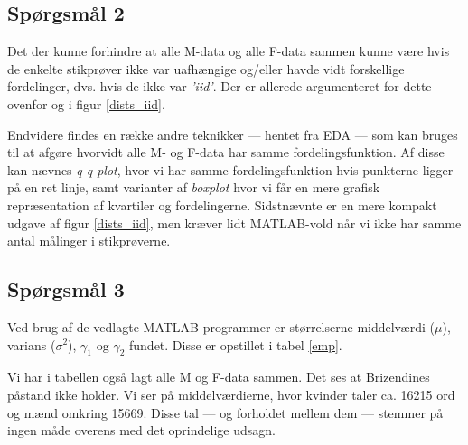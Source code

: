 \documentclass[a4paper, 10pt, danish, final]{article}
\begin{document}
\subsection*{Spørgsmål 2}
Det der kunne forhindre at alle M-data og alle F-data sammen kunne være
hvis de enkelte stikprøver ikke var uafhængige og/eller havde vidt
forskellige fordelinger, dvs. hvis de ikke var \emph{'iid'}. Der er
allerede argumenteret for dette ovenfor og i figur \ref{dists_iid}.

Endvidere findes en række andre teknikker --- hentet fra EDA
\citep[kap. 5]{1199778} --- som kan bruges til at afgøre hvorvidt alle
M- og F-data har samme fordelingsfunktion. Af disse kan nævnes
\emph{q-q plot}, hvor vi har samme fordelingsfunktion hvis punkterne
ligger på en ret linje, samt varianter af \emph{boxplot} hvor vi får en
mere grafisk repræsentation af kvartiler og fordelingerne. Sidstnævnte
er en mere kompakt udgave af figur \ref{dists_iid}, men kræver lidt
MATLAB-vold når vi ikke har samme antal målinger i stikprøverne.

\subsection*{Spørgsmål 3}
Ved brug af de vedlagte MATLAB-programmer er størrelserne middelværdi
($\mu$), varians ($\sigma^2$), $\gamma_1$ og $\gamma_2$ fundet. Disse er
opstillet i tabel \ref{emp}.

Vi har i tabellen også lagt alle M og F-data sammen. Det ses at
Brizendines påstand ikke holder. Vi ser på middelværdierne, hvor kvinder
taler ca. 16215 ord og mænd omkring 15669. Disse tal --- og forholdet
mellem dem --- stemmer på ingen måde overens med det oprindelige udsagn.
\end{document}
